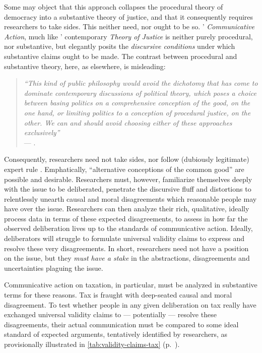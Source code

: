 Some may object that this approach collapses the procedural theory of democracy into a substantive theory of justice, and that it consequently requires researchers to take sides.
This neither need, nor ought to be so.
\citeauthor{Habermas-1984}' \emph{Communicative Action}, much like \citeauthor{Rawls-1971}' contemporary \emph{Theory of Justice} is neither purely procedural, nor substantive, but elegantly posits the \emph{discursive conditions} under which substantive claims ought to be made.
The contrast between procedural and substantive theory, here, as elsewhere, is misleading: 
\begin{quote}
	\emph{``This kind of public philosophy would avoid the dichotomy that has come to dominate contemporary discussions of political theory, which poses a choice between basing politics on a comprehensive conception of the good, on the one hand, or limiting politics to a conception of procedural justice, on the other.
	We can and should avoid choosing either of these approaches exclusively''}\\
	--- \citet[90]{GutmannThompson-2004-aa}.
\end{quote}
Consequently, researchers need not take sides, nor follow (dubiously legitimate) expert rule \citep{Blok2007,Haas1992}.
Emphatically, ``alternative conceptions of the common good'' \citep[23]{Cohen-1989-aa} are possible and desirable.
Researchers must, however, familiarize themselves deeply with the issue to be deliberated, penetrate the discursive fluff and distortions to relentlessly unearth causal and moral disagreements which reasonable people may have over the issue.
Researchers can then analyze their rich, qualitative, ideally process data in terms of these expected disagreements, to assess in how far the observed deliberation lives up to the standards of communicative action.
Ideally, deliberators will struggle to formulate universal validity claims to express and resolve these very disagreements. 
In short, researchers need not have a position on the issue, but they \emph{must have a stake} in the abstractions, disagreements and uncertainties plaguing the issue.

Communicative action on taxation, in particular, must be analyzed in substantive terms for these reasons.
Tax is fraught with deep-seated causal and moral disagreement.
To test whether people in any given deliberation on tax really have exchanged universal validity claims to --- potentially --- resolve these disagreements, their actual communication must be compared to some ideal standard of expected arguments, tentatively identified by researchers, as provisionally illustrated in \autoref{tab:validity-claims-tax} (p.~\pageref{tab:validity-claims-tax}).

